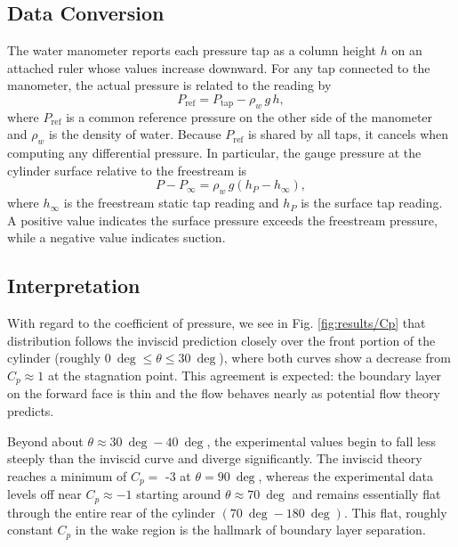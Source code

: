 \subsection{Data Conversion} \label{sec:analysis/conversion}

The water manometer reports each pressure tap as a column height \(h\) on an attached ruler whose values increase downward. For any tap connected to the manometer, the actual pressure is related to the reading by
\begin{equation}
    P_{\text{ref}} = P_{\text{tap}} - \rho_w \, g \, h,
\end{equation}
where \(P_{\text{ref}}\) is a common reference pressure on the other side of the manometer and \(\rho_w\) is the density of water. Because \(P_{\text{ref}}\) is shared by all taps, it cancels when computing any differential pressure. In particular, the gauge pressure at the cylinder surface relative to the freestream is
\begin{equation}
    P - P_\infty = \rho_w \, g \left( h_P - h_\infty \right),
\end{equation}
where \(h_\infty\) is the freestream static tap reading and \(h_P\) is the surface tap reading. A positive value indicates the surface pressure exceeds the freestream pressure, while a negative value indicates suction.

\subsection{Interpretation} \label{sec:analysis/interpretation}

With regard to the coefficient of pressure, we see in Fig. \ref{fig:results/Cp} that distribution follows the inviscid prediction closely over the front portion of the cylinder (roughly \(\qty{0}{\deg} \leq \theta \leq \qty{30}{\deg}\)), where both curves show a decrease from \(C_p \approx 1\) at the stagnation point. This agreement is expected: the boundary layer on the forward face is thin and the flow behaves nearly as potential flow theory predicts.

Beyond about \(\theta \approx \qty{30}{\deg}-\qty{40}{\deg}\), the experimental values begin to fall less steeply than the inviscid curve and diverge significantly. The inviscid theory reaches a minimum of \(C_p=\) -3 at \(\theta=\qty{90}{\deg}\), whereas the experimental data levels off near \(C_p \approx-1\) starting around \(\theta \approx \qty{70}{\deg}\) and remains essentially flat through the entire rear of the cylinder \(\left(\qty{70}{\deg}-\qty{180}{\deg}\right)\). This flat, roughly constant \(C_p\) in the wake region is the hallmark of boundary layer separation.

